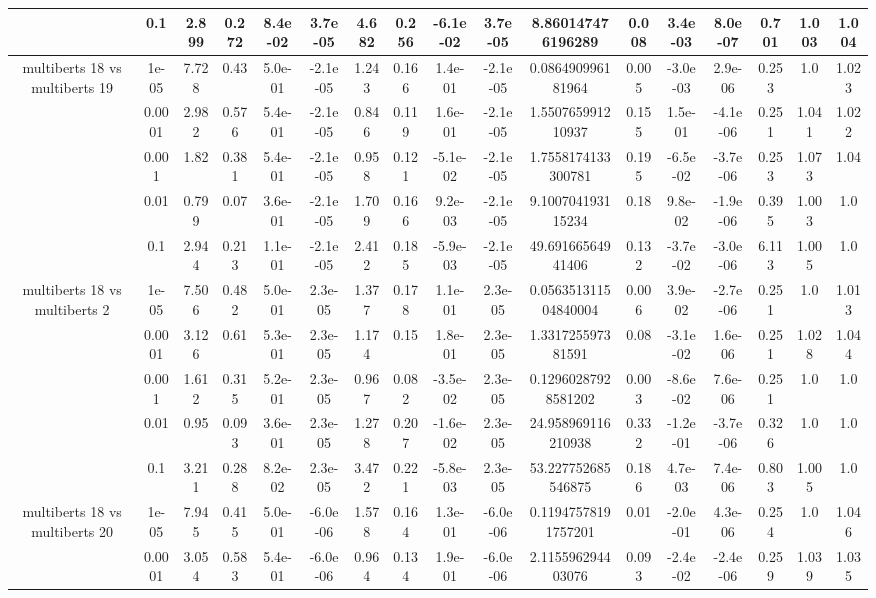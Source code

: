 \begin{tabular}{|c|c|c|c|c|c|c|c|c|c|c|c|c|c|c|c|c|}
 & 0.1 & 2.899 & 0.272 & 8.4e-02 & 3.7e-05 & 4.682 & 0.256 & -6.1e-02 & 3.7e-05 & 8.860147476196289 & 0.008 & 3.4e-03 & 8.0e-07 & 0.701 & 1.003 & 1.004 \\
\hline
\multirow{5}{*}{multiberts 18 vs multiberts 19} & 1e-05 & 7.728 & 0.43 & 5.0e-01 & -2.1e-05 & 1.243 & 0.166 & 1.4e-01 & -2.1e-05 & 0.086490996181964 & 0.005 & -3.0e-03 & 2.9e-06 & 0.253 & 1.0 & 1.023 \\
 & 0.0001 & 2.982 & 0.576 & 5.4e-01 & -2.1e-05 & 0.846 & 0.119 & 1.6e-01 & -2.1e-05 & 1.550765991210937 & 0.155 & 1.5e-01 & -4.1e-06 & 0.251 & 1.041 & 1.022 \\
 & 0.001 & 1.82 & 0.381 & 5.4e-01 & -2.1e-05 & 0.958 & 0.121 & -5.1e-02 & -2.1e-05 & 1.7558174133300781 & 0.195 & -6.5e-02 & -3.7e-06 & 0.253 & 1.073 & 1.04 \\
 & 0.01 & 0.799 & 0.07 & 3.6e-01 & -2.1e-05 & 1.709 & 0.166 & 9.2e-03 & -2.1e-05 & 9.100704193115234 & 0.18 & 9.8e-02 & -1.9e-06 & 0.395 & 1.003 & 1.0 \\
 & 0.1 & 2.944 & 0.213 & 1.1e-01 & -2.1e-05 & 2.412 & 0.185 & -5.9e-03 & -2.1e-05 & 49.69166564941406 & 0.132 & -3.7e-02 & -3.0e-06 & 6.113 & 1.005 & 1.0 \\
\hline
\multirow{5}{*}{multiberts 18 vs multiberts 2} & 1e-05 & 7.506 & 0.482 & 5.0e-01 & 2.3e-05 & 1.377 & 0.178 & 1.1e-01 & 2.3e-05 & 0.056351311504840004 & 0.006 & 3.9e-02 & -2.7e-06 & 0.251 & 1.0 & 1.013 \\
 & 0.0001 & 3.126 & 0.61 & 5.3e-01 & 2.3e-05 & 1.174 & 0.15 & 1.8e-01 & 2.3e-05 & 1.331725597381591 & 0.08 & -3.1e-02 & 1.6e-06 & 0.251 & 1.028 & 1.044 \\
 & 0.001 & 1.612 & 0.315 & 5.2e-01 & 2.3e-05 & 0.967 & 0.082 & -3.5e-02 & 2.3e-05 & 0.12960287928581202 & 0.003 & -8.6e-02 & 7.6e-06 & 0.251 & 1.0 & 1.0 \\
 & 0.01 & 0.95 & 0.093 & 3.6e-01 & 2.3e-05 & 1.278 & 0.207 & -1.6e-02 & 2.3e-05 & 24.958969116210938 & 0.332 & -1.2e-01 & -3.7e-06 & 0.326 & 1.0 & 1.0 \\
 & 0.1 & 3.211 & 0.288 & 8.2e-02 & 2.3e-05 & 3.472 & 0.221 & -5.8e-03 & 2.3e-05 & 53.227752685546875 & 0.186 & 4.7e-03 & 7.4e-06 & 0.803 & 1.005 & 1.0 \\
\hline
\multirow{5}{*}{multiberts 18 vs multiberts 20} & 1e-05 & 7.945 & 0.415 & 5.0e-01 & -6.0e-06 & 1.578 & 0.164 & 1.3e-01 & -6.0e-06 & 0.11947578191757201 & 0.01 & -2.0e-01 & 4.3e-06 & 0.254 & 1.0 & 1.046 \\
 & 0.0001 & 3.054 & 0.583 & 5.4e-01 & -6.0e-06 & 0.964 & 0.134 & 1.9e-01 & -6.0e-06 & 2.115596294403076 & 0.093 & -2.4e-02 & -2.4e-06 & 0.259 & 1.039 & 1.035 \\

\end{tabular}
